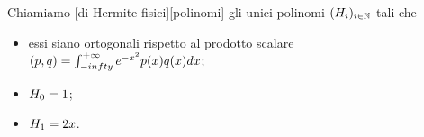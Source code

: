 \begin{Definition}
	Chiamiamo [di Hermite fisici][polinomi] gli unici polinomi $(H_i)_{i \in \mathbb{N}}$ tali che
	\begin{itemize}
		\item essi siano ortogonali rispetto al prodotto scalare $\left ( p , q \right ) = \int_{-infty}^{+\infty} e^{-x^2} p(x)q(x)dx$;
		\item $H_0 = 1$;
		\item $H_1 = 2x$.
	\end{itemize}
\end{Definition}
